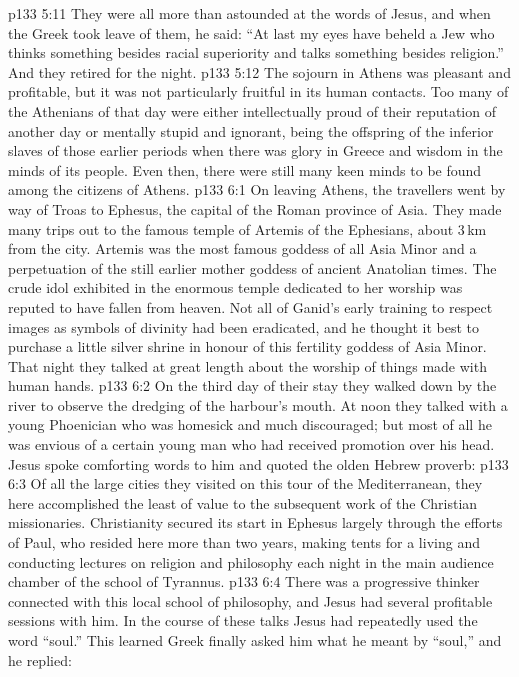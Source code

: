 \vs p133 5:11 \pc They were all more than astounded at the words of Jesus, and when the Greek took leave of them, he said: “At last my eyes have beheld a Jew who thinks something besides racial superiority and talks something besides religion.” And they retired for the night.
\vs p133 5:12 The sojourn in Athens was pleasant and profitable, but it was not particularly fruitful in its human contacts. Too many of the Athenians of that day were either intellectually proud of their reputation of another day or mentally stupid and ignorant, being the offspring of the inferior slaves of those earlier periods when there was glory in Greece and wisdom in the minds of its people. Even then, there were still many keen minds to be found among the citizens of Athens.
\vs p133 6:1 On leaving Athens, the travellers went by way of Troas to Ephesus, the capital of the Roman province of Asia. They made many trips out to the famous temple of Artemis of the Ephesians, about 3\,km from the city. Artemis was the most famous goddess of all Asia Minor and a perpetuation of the still earlier mother goddess of ancient Anatolian times. The crude idol exhibited in the enormous temple dedicated to her worship was reputed to have fallen from heaven. Not all of Ganid’s early training to respect images as symbols of divinity had been eradicated, and he thought it best to purchase a little silver shrine in honour of this fertility goddess of Asia Minor. That night they talked at great length about the worship of things made with human hands.
\vs p133 6:2 On the third day of their stay they walked down by the river to observe the dredging of the harbour’s mouth. At noon they talked with a young Phoenician who was homesick and much discouraged; but most of all he was envious of a certain young man who had received promotion over his head. Jesus spoke comforting words to him and quoted the olden Hebrew proverb: 
\vs p133 6:3 Of all the large cities they visited on this tour of the Mediterranean, they here accomplished the least of value to the subsequent work of the Christian missionaries. Christianity secured its start in Ephesus largely through the efforts of Paul, who resided here more than two years, making tents for a living and conducting lectures on religion and philosophy each night in the main audience chamber of the school of Tyrannus.
\vs p133 6:4 There was a progressive thinker connected with this local school of philosophy, and Jesus had several profitable sessions with him. In the course of these talks Jesus had repeatedly used the word “soul.” This learned Greek finally asked him what he meant by “soul,” and he replied:
